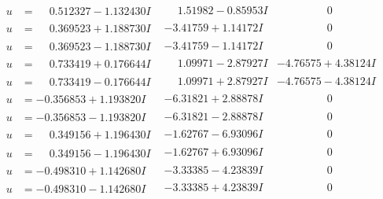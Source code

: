 \documentclass[1p]{elsarticle_modified}
\theoremstyle{definition}
\begin{document}
$$\begin{array}{c|c|c}
\begin{aligned}
u &= \phantom{-}0.512327 - 1.132430 I\end{aligned}
 & \phantom{-}1.51982 - 0.85953 I & \phantom{-0.000000 } 0 \\ \hline\begin{aligned}
u &= \phantom{-}0.369523 + 1.188730 I\end{aligned}
 & -3.41759 + 1.14172 I & \phantom{-0.000000 } 0 \\ \hline\begin{aligned}
u &= \phantom{-}0.369523 - 1.188730 I\end{aligned}
 & -3.41759 - 1.14172 I & \phantom{-0.000000 } 0 \\ \hline\begin{aligned}
u &= \phantom{-}0.733419 + 0.176644 I\end{aligned}
 & \phantom{-}1.09971 - 2.87927 I & -4.76575 + 4.38124 I \\ \hline\begin{aligned}
u &= \phantom{-}0.733419 - 0.176644 I\end{aligned}
 & \phantom{-}1.09971 + 2.87927 I & -4.76575 - 4.38124 I \\ \hline\begin{aligned}
u &= -0.356853 + 1.193820 I\end{aligned}
 & -6.31821 + 2.88878 I & \phantom{-0.000000 } 0 \\ \hline\begin{aligned}
u &= -0.356853 - 1.193820 I\end{aligned}
 & -6.31821 - 2.88878 I & \phantom{-0.000000 } 0 \\ \hline\begin{aligned}
u &= \phantom{-}0.349156 + 1.196430 I\end{aligned}
 & -1.62767 - 6.93096 I & \phantom{-0.000000 } 0 \\ \hline\begin{aligned}
u &= \phantom{-}0.349156 - 1.196430 I\end{aligned}
 & -1.62767 + 6.93096 I & \phantom{-0.000000 } 0 \\ \hline\begin{aligned}
u &= -0.498310 + 1.142680 I\end{aligned}
 & -3.33385 - 4.23839 I & \phantom{-0.000000 } 0 \\ \hline\begin{aligned}
u &= -0.498310 - 1.142680 I\end{aligned}
 & -3.33385 + 4.23839 I & \phantom{-0.000000 } 0 \\ \hline\begin{aligned}

\end{aligned}
\end{array}$$
\end{document}
